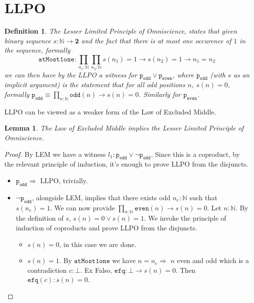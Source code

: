 \documentclass[12pt]{article}
\newtheorem{defn}[thm]{Definition}
\newtheorem{lem}[thm]{Lemma}
\begin{document}
\section{LLPO}
\begin{defn} 
The Lesser Limited Principle of Omniscience, states that given binary sequence $s : \mathbb{N} \rightarrow \mathbf{2}$ and the fact that there is at most one occurence of $1$ in the sequence, formally 
$$\mathtt{atMost1one} :\prod_{n_1 : \mathbb{N}} \prod_{n_2 : \mathbb{N}} s(n_1) = 1 \rightarrow s(n_2)= 1 \rightarrow n_1 = n_2$$
we can then have by the LLPO a witness for $\mathtt{p_{odd}} \vee \mathtt{p_{even}}$, where $\mathtt{p_{odd}}$ (with $s$ as an implicit argument) is the statement that for all odd positions $n$, $s(n) = 0$, formally $\mathtt{p_{odd}} \equiv \prod_{n : \mathbb{N}} \mathtt{odd}(n) \rightarrow s(n) = 0$. 
Similarly for $\mathtt{p_{even}}$. 
\end{defn}
LLPO can be viewed as a weaker form of the Law of Excluded Middle. 

\begin{lem} 
The Law of Excluded Middle implies the Lesser Limited Principle of Omniscience.
\end{lem}

\begin{proof}
By LEM we have a witness $ l_1 :\mathtt{p_{odd}} \vee \neg \mathtt{p_{odd}}$. 
Since this is a coproduct, by the relevant principle of induction, it's enough to prove LLPO from the disjuncts. 
\begin{itemize}
	\item $\mathtt{p_{odd}} \Rightarrow $ LLPO, trivially.

	\item $\neg \mathtt{p_{odd}}$, alongside LEM, implies that there exists odd $n_e : \mathbb{N}$ such that $s(n_e) = 1$. 
	We can now provide $\prod_{n : \mathbb{N}} \mathtt{even}(n) \rightarrow s(n) = 0$. 
	Let $n : \mathbb{N}$. 
	By the definition of $s$, $s(n) = 0 \vee s(n) = 1$.
	We invoke the principle of induction of coproducts and prove LLPO from the disjuncts. 
	\begin{itemize}
		\item $s(n) = 0$, in this case we are done.
		\item $s(n) = 1$. 
		By $\mathtt{atMost1one}$ we have $n = n_e \Rightarrow $ $n$ even and odd which is a contradiction $c : \bot$. 
		Ex Falso,  $\mathtt{efq} : \bot \rightarrow s(n) = 0$. 
		Then $\mathtt{efq}(c) : s(n) = 0$.
	\end{itemize}
\end{itemize}
\end{proof}
\end{document}
